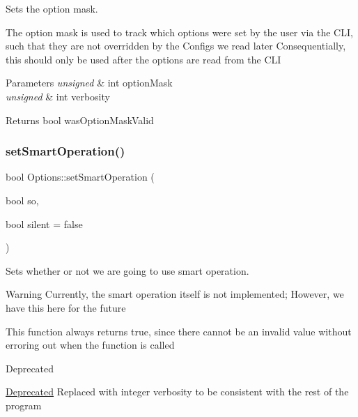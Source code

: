 Sets the option mask. 

The option mask is used to track which options were set by the user via the C\+LI, such that they are not overridden by the Configs we read later Consequentially, this should only be used after the options are read from the C\+LI


\begin{DoxyParams}{Parameters}
{\em unsigned} & int option\+Mask \\
\hline
{\em unsigned} & int verbosity\\
\hline
\end{DoxyParams}
\begin{DoxyReturn}{Returns}
bool was\+Option\+Mask\+Valid 
\end{DoxyReturn}
\mbox{\label{classOptions_af3dc0f64f6189c5d616c8912f22c7d25}} 
\subsubsection{\texorpdfstring{setSmartOperation()}{setSmartOperation()}\hspace{0.1cm}{\footnotesize\ttfamily [1/2]}}
{\footnotesize\ttfamily bool Options\+::set\+Smart\+Operation (\begin{DoxyParamCaption}\item[{bool}]{so,  }\item[{bool}]{silent = {\ttfamily false} }\end{DoxyParamCaption})}



Sets whether or not we are going to use smart operation. 

\begin{DoxyWarning}{Warning}
Currently, the smart operation itself is not implemented; However, we have this here for the future
\end{DoxyWarning}
This function always returns true, since there cannot be an invalid value without error\textquotesingle{}ing out when the function is called

\begin{DoxyRefDesc}{Deprecated}
\item[\mbox{\hyperlink{deprecated__deprecated000008}{Deprecated}}]Replaced with integer verbosity to be consistent with the rest of the program\end{DoxyRefDesc}



